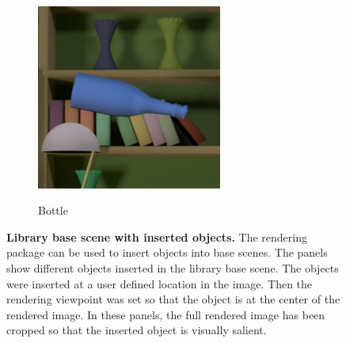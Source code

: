 \documentclass{jov}
\begin{document}
\begin{figure}
\begin{subfigure}[b]{0.14 \textwidth}
        \label{fig:libraryWithRingToy}
    \end{subfigure}
        ~
    	\begin{subfigure}[b]{0.14 \textwidth}
        \caption{Bottle}
        \includegraphics[width=\textwidth]{../FiguresDraft5/Figure3/Figure3_e.png}
        \label{fig:libraryWithChampagneBottle}
    \end{subfigure}
\caption{{\bf Library base scene with inserted objects.} The rendering package can be used to insert objects into base scenes. The panels show different objects inserted in the library base scene. The objects were inserted at a user defined location in the image. Then the rendering viewpoint was set so that the object is at the center of the rendered image. In these panels, the full rendered image has been cropped so that the inserted object is visually salient.}\label{fig:libraryWithTarget}
\end{figure}
\end{document}
